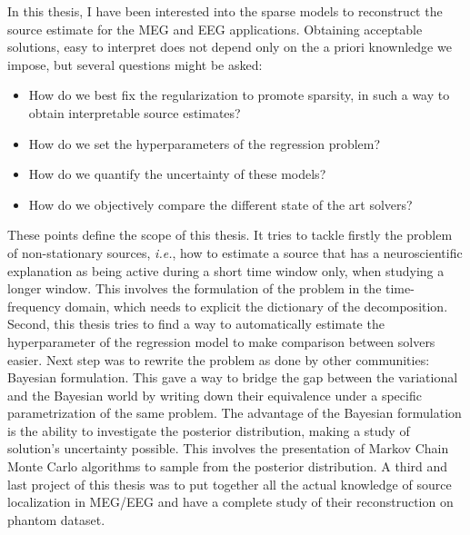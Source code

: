 In this thesis, I have been interested into the sparse models to reconstruct the source estimate for the MEG and EEG applications. Obtaining acceptable solutions, easy to interpret does not depend only on the a priori knownledge we impose, but several questions might be asked:
\begin{itemize}
\item How do we best fix the regularization to promote sparsity, in such a way to obtain interpretable source estimates?
\item How do we set the hyperparameters of the regression problem?
\item How do we quantify the uncertainty of these models?
\item How do we objectively compare the different state of the art solvers?
\end{itemize}
These points define the scope of this thesis. It tries to tackle firstly the problem of non-stationary sources, \textit{i.e.}, how to estimate a source that has a neuroscientific explanation as being active during a short time window only, when studying a longer window. This involves the formulation of the problem in the time-frequency domain, which needs to explicit the dictionary of the decomposition. Second, this thesis tries to find a way to automatically estimate the hyperparameter of the regression model to make comparison between solvers easier. Next step was to rewrite the problem as done by other communities: Bayesian formulation. This gave a way to bridge the gap between the variational and the Bayesian world by writing down their equivalence under a specific parametrization of the same problem. The advantage of the Bayesian formulation is the ability to investigate the posterior distribution, making a study of solution's uncertainty possible. This involves the presentation of Markov Chain Monte Carlo algorithms to sample from the posterior distribution. A third and last project of this thesis was to put together all the actual knowledge of source localization in MEG/EEG and have a complete study of their reconstruction on phantom dataset.

